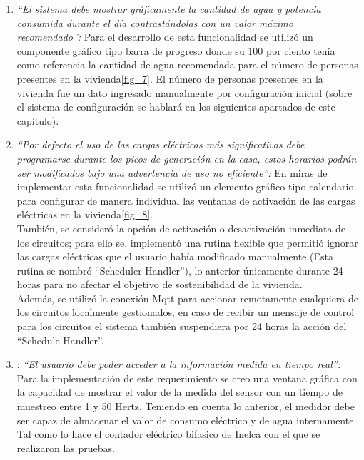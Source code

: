 \begin{enumerate}
	\item \textsl{``El sistema debe mostrar gráficamente la cantidad de agua y potencia consumida durante el día contrastándolas con un valor máximo recomendado'':} Para el desarrollo de esta funcionalidad se utilizó un componente gráfico tipo barra de progreso donde su 100 por ciento tenía como referencia la cantidad de agua recomendada para el número de personas presentes en la vivienda\ref{fig_7}. El número de personas presentes en la vivienda fue un dato ingresado manualmente por configuración inicial (sobre el sistema de configuración se hablará en los siguientes apartados de este capítulo).
	
	\item \textsl{``Por defecto el uso de las cargas eléctricas más significativas debe programarse durante los picos de generación en la casa, estos horarios podrán ser modificados bajo una advertencia de uso no eficiente'':} En miras de implementar esta funcionalidad se utilizó un elemento gráfico tipo calendario para configurar de manera individual las ventanas de activación de las cargas eléctricas en la vivienda\ref{fig_8}.
	\vspace{0.5cm}\\ 
	También, se consideró la opción de activación o desactivación inmediata de los circuitos; para ello se, implementó una rutina flexible que permitió ignorar las cargas eléctricas que el usuario había modificado manualmente (Esta rutina se nombró ``Scheduler Handler''), lo anterior únicamente durante 24 horas para no afectar el objetivo de sostenibilidad de la vivienda. 
	\vspace{0.5cm}\\
	Además, se utilizó la conexión Mqtt para accionar remotamente cualquiera de los circuitos localmente gestionados, en caso de recibir un mensaje de control para los circuitos el sistema también suspendiera por 24 horas la acción del ``Schedule Handler''.
	\item: \textsl{``El usuario debe poder acceder a la información medida en tiempo real'':} Para la implementación de este requerimiento se creo una ventana gráfica con la capacidad de mostrar el valor de la medida del sensor con un tiempo de muestreo entre 1 y 50 Hertz. Teniendo en cuenta lo anterior, el medidor debe ser capaz de almacenar el valor de consumo eléctrico y de agua internamente. Tal como lo hace el contador eléctrico bifasico de Inelca con el que se realizaron las pruebas.
	\vspace{0.5cm}\\

\end{enumerate}
